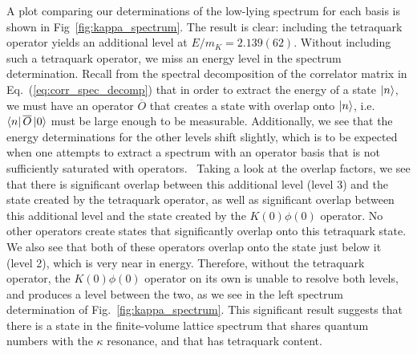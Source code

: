 A plot comparing our determinations of the low-lying spectrum for each basis is shown in Fig~\ref{fig:kappa_spectrum}. The result is clear: including the tetraquark operator yields an additional level at $E/m_K = 2.139(62)$. Without including such a tetraquark operator, we miss an energy level in the spectrum determination. Recall from the spectral decomposition of the correlator matrix in Eq.~(\ref{eq:corr_spec_decomp}) that in order to extract the energy of a state $\ket{n}$, we must have an operator $\overline O$ that creates a state with overlap onto $\ket{n}$, i.e. $\bra{n}\overline O\ket{0}$ must be large enough to be measurable. Additionally, we see that the energy determinations for the other levels shift slightly, which is to be expected when one attempts to extract a spectrum with an operator basis that is not sufficiently saturated with operators.~\cite{Dudek:2012xn} Taking a look at the overlap factors, we see that there is significant overlap between this additional level (level 3) and the state created by the tetraquark operator, as well as significant overlap between this additional level and the state created by the $K(0)\phi(0)$ operator. No other operators create states that significantly overlap onto this tetraquark state. We also see that both of these operators overlap onto the state just below it (level 2), which is very near in energy. Therefore, without the tetraquark operator, the $K(0)\phi(0)$ operator on its own is unable to resolve both levels, and produces a level between the two, as we see in the left spectrum determination of Fig.~\ref{fig:kappa_spectrum}. This significant result suggests that there is a state in the finite-volume lattice spectrum that shares quantum numbers with the $\kappa$ resonance, and that has tetraquark content.


